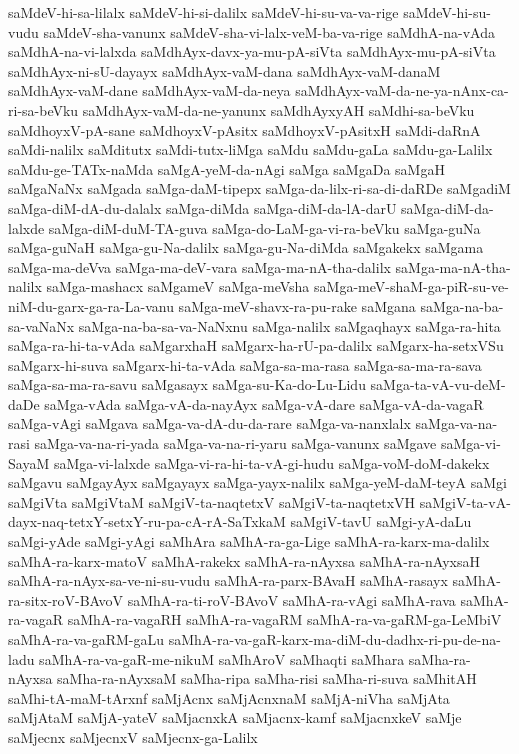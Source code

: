 {saMdeV-hi-sa-lilalx
saMdeV-hi-si-dalilx
saMdeV-hi-su-va-va-rige
saMdeV-hi-su-vudu
saMdeV-sha-vanunx
saMdeV-sha-vi-lalx-veM-ba-va-rige
saMdhA-na-vAda
saMdhA-na-vi-lalxda
saMdhAyx-davx-ya-mu-pA-siVta
saMdhAyx-mu-pA-siVta
saMdhAyx-ni-sU-dayayx
saMdhAyx-vaM-dana
saMdhAyx-vaM-danaM
saMdhAyx-vaM-dane
saMdhAyx-vaM-da-neya
saMdhAyx-vaM-da-ne-ya-nAnx-ca-ri-sa-beVku
saMdhAyx-vaM-da-ne-yanunx
saMdhAyxyAH
saMdhi-sa-beVku
saMdhoyxV-pA-sane
saMdhoyxV-pAsitx
saMdhoyxV-pAsitxH
saMdi-daRnA
saMdi-nalilx
saMditutx
saMdi-tutx-liMga
saMdu
saMdu-gaLa
saMdu-ga-Lalilx
saMdu-ge-TATx-naMda
saMgA-yeM-da-nAgi
saMga
saMgaDa
saMgaH
saMgaNaNx
saMgada
saMga-daM-tipepx
saMga-da-lilx-ri-sa-di-daRDe
saMgadiM
saMga-diM-dA-du-dalalx
saMga-diMda
saMga-diM-da-lA-darU
saMga-diM-da-lalxde
saMga-diM-duM-TA-guva
saMga-do-LaM-ga-vi-ra-beVku
saMga-guNa
saMga-guNaH
saMga-gu-Na-dalilx
saMga-gu-Na-diMda
saMgakekx
saMgama
saMga-ma-deVva
saMga-ma-deV-vara
saMga-ma-nA-tha-dalilx
saMga-ma-nA-tha-nalilx
saMga-mashacx
saMgameV
saMga-meVsha
saMga-meV-shaM-ga-piR-su-ve-niM-du-garx-ga-ra-La-vanu
saMga-meV-shavx-ra-pu-rake
saMgana
saMga-na-ba-sa-vaNaNx
saMga-na-ba-sa-va-NaNxnu
saMga-nalilx
saMgaqhayx
saMga-ra-hita
saMga-ra-hi-ta-vAda
saMgarxhaH
saMgarx-ha-rU-pa-dalilx
saMgarx-ha-setxVSu
saMgarx-hi-suva
saMgarx-hi-ta-vAda
saMga-sa-ma-rasa
saMga-sa-ma-ra-sava
saMga-sa-ma-ra-savu
saMgasayx
saMga-su-Ka-do-Lu-Lidu
saMga-ta-vA-vu-deM-daDe
saMga-vAda
saMga-vA-da-nayAyx
saMga-vA-dare
saMga-vA-da-vagaR
saMga-vAgi
saMgava
saMga-va-dA-du-da-rare
saMga-va-nanxlalx
saMga-va-na-rasi
saMga-va-na-ri-yada
saMga-va-na-ri-yaru
saMga-vanunx
saMgave
saMga-vi-SayaM
saMga-vi-lalxde
saMga-vi-ra-hi-ta-vA-gi-hudu
saMga-voM-doM-dakekx
saMgavu
saMgayAyx
saMgayayx
saMga-yayx-nalilx
saMga-yeM-daM-teyA
saMgi
saMgiVta
saMgiVtaM
saMgiV-ta-naqtetxV
saMgiV-ta-naqtetxVH
saMgiV-ta-vA-dayx-naq-tetxY-setxY-ru-pa-cA-rA-SaTxkaM
saMgiV-tavU
saMgi-yA-daLu
saMgi-yAde
saMgi-yAgi
saMhAra
saMhA-ra-ga-Lige
saMhA-ra-karx-ma-dalilx
saMhA-ra-karx-matoV
saMhA-rakekx
saMhA-ra-nAyxsa
saMhA-ra-nAyxsaH
saMhA-ra-nAyx-sa-ve-ni-su-vudu
saMhA-ra-parx-BAvaH
saMhA-rasayx
saMhA-ra-sitx-roV-BAvoV
saMhA-ra-ti-roV-BAvoV
saMhA-ra-vAgi
saMhA-rava
saMhA-ra-vagaR
saMhA-ra-vagaRH
saMhA-ra-vagaRM
saMhA-ra-va-gaRM-ga-LeMbiV
saMhA-ra-va-gaRM-gaLu
saMhA-ra-va-gaR-karx-ma-diM-du-dadhx-ri-pu-de-na-ladu
saMhA-ra-va-gaR-me-nikuM
saMhAroV
saMhaqti
saMhara
saMha-ra-nAyxsa
saMha-ra-nAyxsaM
saMha-ripa
saMha-risi
saMha-ri-suva
saMhitAH
saMhi-tA-maM-tArxnf
saMjAcnx
saMjAcnxnaM
saMjA-niVha
saMjAta
saMjAtaM
saMjA-yateV
saMjacnxkA
saMjacnx-kamf
saMjacnxkeV
saMje
saMjecnx
saMjecnxV
saMjecnx-ga-Lalilx
}
